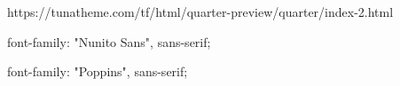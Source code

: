 


https://tunatheme.com/tf/html/quarter-preview/quarter/index-2.html

font-family: "Nunito Sans", sans-serif;

font-family: "Poppins", sans-serif;



